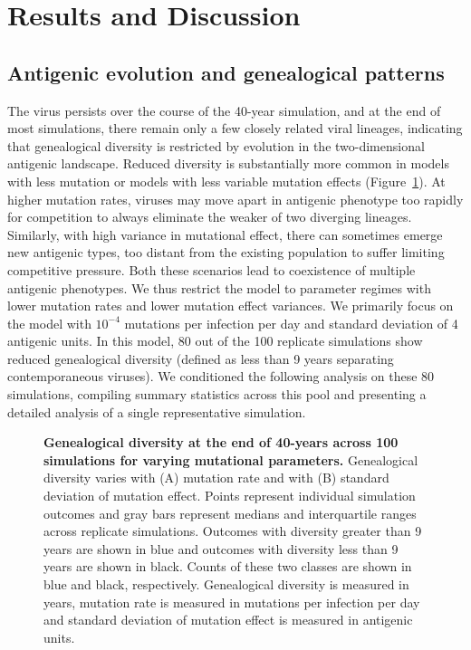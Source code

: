 \documentclass[11pt,oneside,letterpaper]{article}
\begin{document}
\section*{Results and Discussion}

\subsection*{Antigenic evolution and genealogical patterns}

The virus persists over the course of the 40-year simulation, and at the end of most simulations, there remain only a few closely related viral lineages, indicating that genealogical diversity is restricted by evolution in the two-dimensional antigenic landscape.  Reduced diversity is substantially more common in models with less mutation or models with less variable mutation effects (Figure~\ref{param}).  At higher mutation rates, viruses may move apart in antigenic phenotype too rapidly for competition to always eliminate the weaker of two diverging lineages.  Similarly, with high variance in mutational effect, there can sometimes emerge new antigenic types, too distant from the existing population to suffer limiting competitive pressure.  Both these scenarios lead to coexistence of multiple antigenic phenotypes.  We thus restrict the model to parameter regimes with lower mutation rates and lower mutation effect variances.  We primarily focus on the model with $10^{-4}$ mutations per infection per day and standard deviation of 4 antigenic units.  In this model, 80 out of the 100 replicate simulations show reduced genealogical diversity (defined as less than 9 years separating contemporaneous viruses).  We conditioned the following analysis on these 80 simulations, compiling summary statistics across this pool and presenting a detailed analysis of a single representative simulation.  

\begin{figure}[tb]
	\centering		
	\caption{\textbf{Genealogical diversity at the end of 40-years across 100 simulations for varying mutational parameters.} Genealogical diversity varies with (A) mutation rate and with (B) standard deviation of mutation effect.  Points represent individual simulation outcomes and gray bars represent medians and interquartile ranges across replicate simulations.  Outcomes with diversity greater than 9 years are shown in blue and outcomes with diversity less than 9 years are shown in black.  Counts of these two classes are shown in blue and black, respectively.  Genealogical diversity is measured in years, mutation rate is measured in mutations per infection per day and standard deviation of mutation effect is measured in antigenic units.}
	\label{param}
\end{figure}
\end{document}
